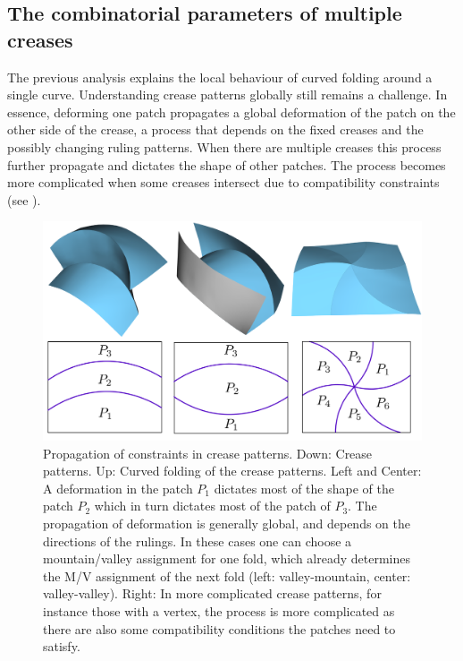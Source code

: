 
\subsection{The combinatorial parameters of multiple creases}
The previous analysis explains the local behaviour of curved folding around a single curve. Understanding crease patterns globally still remains a challenge. In essence, deforming one patch propagates a global deformation of the patch on the other side of the crease, a process that depends on the fixed creases and the possibly changing ruling patterns. When there are multiple creases this process further propagate and dictates the shape of other patches. The process becomes more complicated when some creases intersect due to compatibility constraints (see ). 

\begin{figure} [h]
	\centering
	\includegraphics[width=\linewidth]{figures/multiple_crease_patterns}
	\caption{Propagation of constraints in crease patterns. Down: Crease patterns. Up: Curved folding of the crease patterns. Left and Center: A deformation in the patch $P_1$ dictates most of the shape of the patch $P_2$ which in turn dictates most of the patch of $P_3$. The propagation of deformation is generally global, and depends on the directions of the rulings. In these cases one can choose a mountain/valley assignment for one fold, which already determines the M/V assignment of the next fold (left: valley-mountain, center: valley-valley). Right: In more complicated crease patterns, for instance those with a vertex, the process is more complicated as there are also some compatibility conditions the patches need to satisfy. }
	\label{fig:multiple_crease_patterns}
\end{figure}

